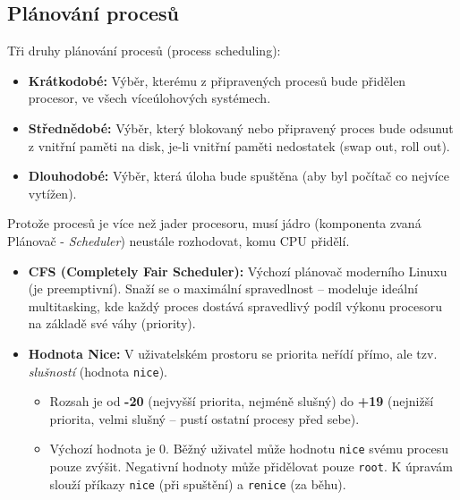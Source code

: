 \subsection{Plánování procesů}
Tři druhy plánování procesů (process scheduling):
\begin{itemize}
    \item \textbf{Krátkodobé:} Výběr, kterému z připravených procesů
bude přidělen procesor, ve všech víceúlohových
systémech.
    \item \textbf{Střednědobé:} Výběr, který
blokovaný nebo připravený proces bude odsunut z
vnitřní paměti na disk, je-li vnitřní paměti nedostatek
(swap out, roll out).
    \item \textbf{Dlouhodobé:} Výběr, která úloha bude spuštěna (aby byl počítač co nejvíce vytížen).
\end{itemize}
Protože procesů je více než jader procesoru, musí jádro (komponenta zvaná Plánovač - \textit{Scheduler}) neustále rozhodovat, komu CPU přidělí.
\begin{itemize}
    \item \textbf{CFS (Completely Fair Scheduler):} Výchozí plánovač moderního Linuxu (je preemptivní). Snaží se o maximální spravedlnost – modeluje ideální multitasking, kde každý proces dostává spravedlivý podíl výkonu procesoru na základě své váhy (priority).
    \item \textbf{Hodnota Nice:} V uživatelském prostoru se priorita neřídí přímo, ale tzv. \textit{slušností} (hodnota \texttt{nice}).
    \begin{itemize}
        \item Rozsah je od \textbf{-20} (nejvyšší priorita, nejméně slušný) do \textbf{+19} (nejnižší priorita, velmi slušný – pustí ostatní procesy před sebe).
        \item Výchozí hodnota je 0. Běžný uživatel může hodnotu \texttt{nice} svému procesu pouze zvýšit. Negativní hodnoty může přidělovat pouze \texttt{root}. K úpravám slouží příkazy \texttt{nice} (při spuštění) a \texttt{renice} (za běhu).
    \end{itemize}
\end{itemize}

